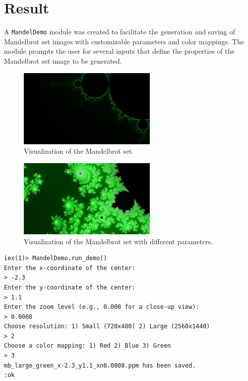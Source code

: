 \documentclass[a4paper,11pt]{article}
\newenvironment{longlisting}{\captionsetup{type=listing}}{}
\begin{document}
\section*{Result}
\label{sec:result}
A
\texttt{MandelDemo} module was created to facilitate the generation and saving of Mandelbrot set images
with customizable parameters and color mappings.
The module prompts the user for several inputs that define the properties of the Mandelbrot set image to be generated.
\begin{figure}[h!]
    \centering
    \includegraphics[width=0.6\textwidth]{../images/mb_large_green_x-2.3_y1.1_xn0.0008.png}
    \caption{Visualization of the Mandelbrot set.}
    \label{fig:mandelbrot1}
\end{figure}
\begin{figure}[h!]
    \centering
    \includegraphics[width=0.6\textwidth]{../images/mb_large_green_x1.0e-5_y0.644_xn0.008.png}
    \caption{Visualization of the Mandelbrot set with different parameters.}
    \label{fig:mandelbrot2}
\end{figure}
\begin{longlisting}
\begin{verbatim}
iex(1)> MandelDemo.run_demo()
Enter the x-coordinate of the center:
> -2.3
Enter the y-coordinate of the center:
> 1.1
Enter the zoom level (e.g., 0.008 for a close-up view):
> 0.0008
Choose resolution: 1) Small (720x480) 2) Large (2560x1440)
> 2
Choose a color mapping: 1) Red 2) Blue 3) Green
> 3
mb_large_green_x-2.3_y1.1_xn0.0008.ppm has been saved.
:ok
\end{verbatim}
\caption{The prompt that generated figure~\ref{fig:mandelbrot1}
}
\label{listing:demo1}
\end{longlisting}
\end{document}
